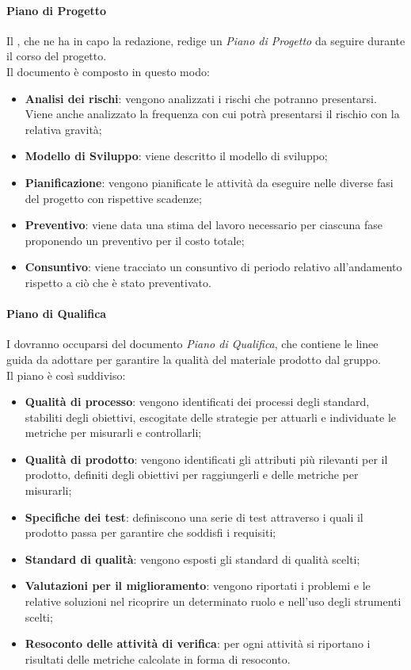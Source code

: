 			\paragraph{Piano di Progetto}
			Il , che ne ha in capo la redazione, redige un \textit{Piano di Progetto} da seguire durante	il corso del progetto.
			\\
			Il documento è composto in questo modo: 
			\begin{itemize}
				\item \textbf{Analisi dei rischi}: vengono analizzati i rischi che potranno presentarsi. Viene anche analizzato la frequenza con cui potrà presentarsi il rischio con la relativa gravità;
				\item \textbf{Modello di Sviluppo}: viene descritto il modello di sviluppo;
				\item \textbf{Pianificazione}: vengono pianificate le attività da eseguire nelle diverse fasi del progetto con rispettive scadenze;
				\item \textbf{Preventivo}: viene data una stima del lavoro necessario per ciascuna fase proponendo un preventivo per il costo totale;
				\item \textbf{Consuntivo}: viene tracciato un consuntivo di periodo relativo all'andamento rispetto a ciò che è stato preventivato.
			\end{itemize}
			\paragraph{Piano di Qualifica}
			I  dovranno occuparsi del documento \textit{Piano di Qualifica}, che contiene le linee guida da adottare per garantire la qualità del materiale prodotto dal gruppo.
			\\
			Il piano è così suddiviso:			 
			\begin{itemize}
				\item \textbf{Qualità di processo}: vengono identificati dei processi degli standard, stabiliti degli obiettivi, escogitate delle strategie per attuarli e individuate le metriche per misurarli e controllarli;
				\item \textbf{Qualità di prodotto}: vengono identificati gli attributi più rilevanti per il prodotto, definiti degli obiettivi per raggiungerli e delle metriche per misurarli;
				\item \textbf{Specifiche dei test}: definiscono una serie di test attraverso i quali il prodotto passa per garantire che soddisfi i requisiti;
				\item \textbf{Standard di qualità}: vengono esposti gli standard di qualità scelti;
				\item \textbf{Valutazioni per il miglioramento}: vengono riportati i problemi e le relative soluzioni nel ricoprire un determinato ruolo e nell'uso degli strumenti scelti;
				\item \textbf{Resoconto delle attività di verifica}: per ogni attività si riportano i risultati delle metriche calcolate in forma di resoconto.
			\end{itemize}

